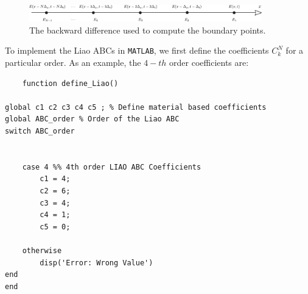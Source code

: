 \documentclass[12pt]{article}
\begin{document}
\begin{figure}[t!]
  \centering
  \includegraphics[width=0.9\textwidth]{backward difference.pdf}
  \caption{The backward difference used to compute the boundary points.}
  \label{fig:backward_difference}
\end{figure}

To implement the Liao ABCs in \texttt{MATLAB}, we first define the coefficients $C_k^N$ for a particular order. As an example, the $4-th$ order coefficients are:

\begin{mdframed}[backgroundcolor=gray!20]
  \scriptsize
  \begin{verbatim}
    function define_Liao()

global c1 c2 c3 c4 c5 ; % Define material based coefficients
global ABC_order % Order of the Liao ABC 
switch ABC_order
  
        
    case 4 %% 4th order LIAO ABC Coefficients
        c1 = 4;
        c2 = 6;
        c3 = 4;
        c4 = 1;
        c5 = 0;
        
    otherwise
        disp('Error: Wrong Value')
end
end
  \end{verbatim}
\end{mdframed}
\end{document}
